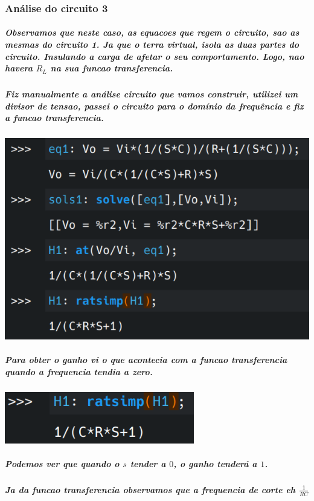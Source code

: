 \documentclass[12pt,twoside, a4paper, twocolumn]{article}
\begin{document}
\subsubsection{Análise do circuito 3}

\subparagraph*{Observamos que neste caso, as equacoes que regem o circuito, sao as mesmas do circuito 1. Ja que o terra virtual, isola as duas partes do circuito. Insulando a carga de afetar o seu comportamento. Logo, nao havera $R_L$ na sua funcao transferencia.}

\subparagraph*{Fiz manualmente a análise circuito que vamos construir, utilizei um divisor de tensao, passei o circuito para o domínio da frequência e fiz a funcao transferencia.}
\subparagraph*{}

\begin{adjustbox}{scale=0.4}
    \includegraphics{eqs1.png}
\end{adjustbox}


\subparagraph*{Para obter o ganho vi o que acontecia com a funcao transferencia quando a frequencia tendia a zero.}
\subparagraph*{}
\begin{adjustbox}{scale=0.4}
    \includegraphics{ganho1.png}
\end{adjustbox}
\subparagraph*{Podemos ver que quando o $s$ tender a $0$, o ganho tenderá a $1$.}

\subparagraph*{Ja da funcao transferencia observamos que a frequencia de corte eh $\frac{1}{RC}$}
\end{document}
